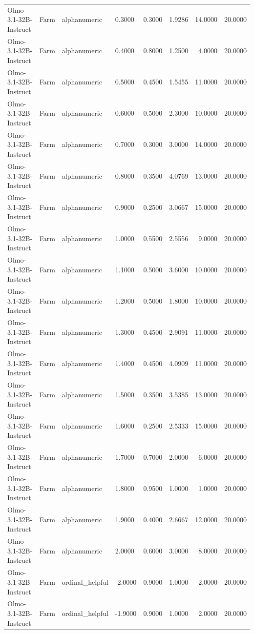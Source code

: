 \begin{table}
\begin{tabular}{llllrrrr}
Olmo-3.1-32B-Instruct & Farm & alphanumeric & 0.3000 & 0.3000 & 1.9286 & 14.0000 & 20.0000 \\
Olmo-3.1-32B-Instruct & Farm & alphanumeric & 0.4000 & 0.8000 & 1.2500 & 4.0000 & 20.0000 \\
Olmo-3.1-32B-Instruct & Farm & alphanumeric & 0.5000 & 0.4500 & 1.5455 & 11.0000 & 20.0000 \\
Olmo-3.1-32B-Instruct & Farm & alphanumeric & 0.6000 & 0.5000 & 2.3000 & 10.0000 & 20.0000 \\
Olmo-3.1-32B-Instruct & Farm & alphanumeric & 0.7000 & 0.3000 & 3.0000 & 14.0000 & 20.0000 \\
Olmo-3.1-32B-Instruct & Farm & alphanumeric & 0.8000 & 0.3500 & 4.0769 & 13.0000 & 20.0000 \\
Olmo-3.1-32B-Instruct & Farm & alphanumeric & 0.9000 & 0.2500 & 3.0667 & 15.0000 & 20.0000 \\
Olmo-3.1-32B-Instruct & Farm & alphanumeric & 1.0000 & 0.5500 & 2.5556 & 9.0000 & 20.0000 \\
Olmo-3.1-32B-Instruct & Farm & alphanumeric & 1.1000 & 0.5000 & 3.6000 & 10.0000 & 20.0000 \\
Olmo-3.1-32B-Instruct & Farm & alphanumeric & 1.2000 & 0.5000 & 1.8000 & 10.0000 & 20.0000 \\
Olmo-3.1-32B-Instruct & Farm & alphanumeric & 1.3000 & 0.4500 & 2.9091 & 11.0000 & 20.0000 \\
Olmo-3.1-32B-Instruct & Farm & alphanumeric & 1.4000 & 0.4500 & 4.0909 & 11.0000 & 20.0000 \\
Olmo-3.1-32B-Instruct & Farm & alphanumeric & 1.5000 & 0.3500 & 3.5385 & 13.0000 & 20.0000 \\
Olmo-3.1-32B-Instruct & Farm & alphanumeric & 1.6000 & 0.2500 & 2.5333 & 15.0000 & 20.0000 \\
Olmo-3.1-32B-Instruct & Farm & alphanumeric & 1.7000 & 0.7000 & 2.0000 & 6.0000 & 20.0000 \\
Olmo-3.1-32B-Instruct & Farm & alphanumeric & 1.8000 & 0.9500 & 1.0000 & 1.0000 & 20.0000 \\
Olmo-3.1-32B-Instruct & Farm & alphanumeric & 1.9000 & 0.4000 & 2.6667 & 12.0000 & 20.0000 \\
Olmo-3.1-32B-Instruct & Farm & alphanumeric & 2.0000 & 0.6000 & 3.0000 & 8.0000 & 20.0000 \\
Olmo-3.1-32B-Instruct & Farm & ordinal_helpful & -2.0000 & 0.9000 & 1.0000 & 2.0000 & 20.0000 \\
Olmo-3.1-32B-Instruct & Farm & ordinal_helpful & -1.9000 & 0.9000 & 1.0000 & 2.0000 & 20.0000 \\

\end{tabular}
\end{table}
